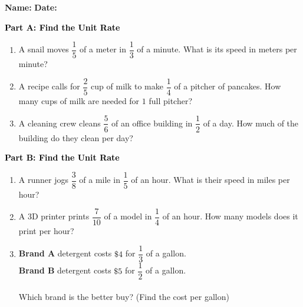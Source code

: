 \documentclass[12pt, letterpaper, fleqn]{article}
\begin{document}
\textbf{Name:} \underline{\hspace{5cm}}
\hfill
\textbf{Date:} \underline{\hspace{3cm}}\\

\begin{tcolorbox}[colback=customteal!20]
\large\textcolor{black}{\textbf{Part A: Find the Unit Rate}}
\end{tcolorbox}

\vspace{3mm}

\begin{enumerate}[itemsep=4.2cm, leftmargin=0.6cm]
\item A snail moves $\dfrac{1}{5}$ of a meter in $\dfrac{1}{3}$ of a minute. What is its speed in meters per minute?
\item A recipe calls for $\dfrac{2}{5}$ cup of milk to make $\dfrac{1}{4}$ of a pitcher of pancakes. How many cups of milk are needed for $1$ full pitcher?
\item A cleaning crew cleans $\dfrac{5}{6}$ of an office building in $\dfrac{1}{2}$ of a day. How much of the building do they clean per day?
\end{enumerate}

\newpage

\begin{tcolorbox}[colback=customteal!20]
\large\textcolor{black}{\textbf{Part B: Find the Unit Rate}}
\end{tcolorbox}

\vspace{3mm}

\begin{enumerate}[itemsep=4.2cm, leftmargin=0.6cm, resume]
\item A runner jogs $\dfrac{3}{8}$ of a mile in $\dfrac{1}{5}$ of an hour. What is their speed in miles per hour?
\item A 3D printer prints $\dfrac{7}{10}$ of a model in $\dfrac{1}{4}$ of an hour. How many models does it print per hour?
\item \textbf{Brand A} detergent costs $\$4$ for $\dfrac{1}{3}$ of a gallon. \\
\textbf{Brand B} detergent costs $\$5$ for $\dfrac{1}{2}$ of a gallon. \\ \\
Which brand is the better buy? (Find the cost per gallon)
\end{enumerate}
\end{document}
